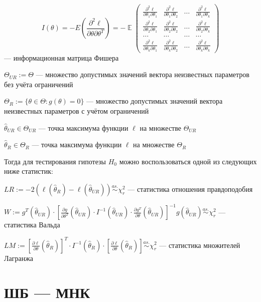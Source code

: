 \documentclass[12pt]{article}
\DeclareMathOperator{\E}{\mathbb{E}}
\begin{document}
\[
I(\theta) = -E \left(\frac{\partial^2 \ell}{\partial \theta \partial \theta^T}\right) = - \E \begin{pmatrix}
\frac{\partial^2 \ell}{\partial \theta_1 \partial \theta_1} & \frac{\partial^2 \ell}{\partial \theta_1 \partial \theta_2} & \ldots & \frac{\partial^2 \ell}{\partial \theta_1 \partial \theta_k} \\
\frac{\partial^2 \ell}{\partial \theta_2 \partial \theta_1} & \frac{\partial^2 \ell}{\partial \theta_2 \partial \theta_2} & \ldots & \frac{\partial^2 \ell}{\partial \theta_2 \partial \theta_k} \\
\ldots & \ldots & \ldots & \ldots \\
\frac{\partial^2 \ell}{\partial \theta_k \partial \theta_1} & \frac{\partial^2 \ell}{\partial \theta_k \partial \theta_2} & \ldots & \frac{\partial^2 \ell}{\partial \theta_k \partial \theta_k} 
\end{pmatrix}
\]
— информационная матрица Фишера

$\Theta_{UR} := \Theta$ — множество допустимых значений вектора неизвестных параметров без учёта ограничений

$\Theta_{R} := \{ \theta \in \Theta: g(\theta) = 0\}$ — множество допустимых значений вектора неизвестных параметров с учётом ограничений

$\hat{\theta}_{UR} \in \Theta_{UR}$ — точка максимума функции $\ell$ на множестве $\Theta_{UR}$

$\hat{\theta}_{R} \in \Theta_{R}$ — точка максимума функции $\ell$ на множестве $\Theta_{R}$

Тогда для тестирования гипотезы $H_0$ можно воспользоваться одной из следующих ниже статистик:

$LR := -2(\ell(\hat{\theta}_{R}) - \ell(\hat{\theta}_{UR})) \overset{as.}{\sim} \chi^2_r$ — статистика отношения правдоподобия

$W := g^T(\hat{\theta}_{UR}) \cdot \left[ \frac{\partial g}{\partial \theta^T}(\hat{\theta}_{UR}) \cdot I^{-1}(\hat{\theta}_{UR}) \cdot \frac{\partial g^T}{\partial \theta}(\hat{\theta}_{UR}) \right]^{-1} g(\hat{\theta}_{UR}) \overset{as.}{\sim} \chi^2_r$ — статистика Вальда

$LM := \left[ \frac{\partial \ell}{\partial \theta}(\hat{\theta}_{R}) \right]^T \cdot I^{-1}(\hat{\theta}_{R}) \cdot \left[ \frac{\partial \ell}{\partial \theta}(\hat{\theta}_{R}) \right] \overset{as.}{\sim} \chi^2_r$ — статистика множителей Лагранжа


\section{ШБ — МНК}
\end{document}
